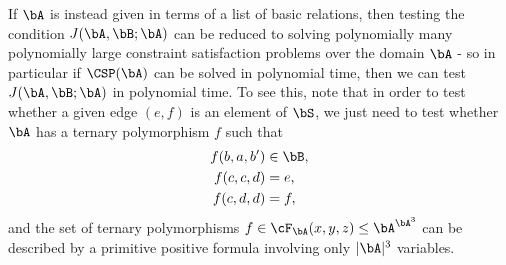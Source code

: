 If $\bA$ is instead given in terms of a list of basic relations, then testing the condition $J(\bA,\bB;\bA)$ can be reduced to solving polynomially many polynomially large constraint satisfaction problems over the domain $\bA$ - so in particular if $\CSP(\bA)$ can be solved in polynomial time, then we can test $J(\bA,\bB;\bA)$ in polynomial time. To see this, note that in order to test whether a given edge $(e,f)$ is an element of $\bS$, we just need to test whether $\bA$ has a ternary polymorphism $f$ such that
\begin{align*}
f(b,a,b') &\in \bB,\\
f(c,c,d) &= e,\\
f(c,d,d) &= f,
\end{align*}
and the set of ternary polymorphisms $f \in \cF_{\bA}(x,y,z) \le \bA^{\bA^3}$ can be described by a primitive positive formula involving only $|\bA|^3$ variables.

